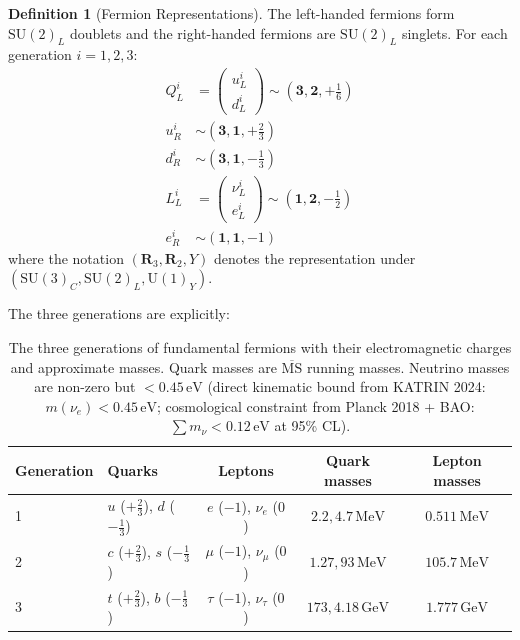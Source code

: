 \documentclass[12pt]{article}
\theoremstyle{definition}
\newtheorem{definition}[theorem]{Definition}
\theoremstyle{remark}
\newcommand{\GeV}{\,\mathrm{GeV}}
\newcommand{\MeV}{\,\mathrm{MeV}}
\begin{document}
\begin{definition}[Fermion Representations]
\label{def:fermionreps}
The left-handed fermions form $\mathrm{SU}(2)_L$ doublets and the right-handed fermions are $\mathrm{SU}(2)_L$ singlets. For each generation $i = 1, 2, 3$:
\begin{align}
Q_L^i &= \begin{pmatrix} u_L^i \\ d_L^i \end{pmatrix} \sim (\mathbf{3}, \mathbf{2}, +\tfrac{1}{6}) \\[4pt]
u_R^i &\sim (\mathbf{3}, \mathbf{1}, +\tfrac{2}{3}) \\[4pt]
d_R^i &\sim (\mathbf{3}, \mathbf{1}, -\tfrac{1}{3}) \\[4pt]
L_L^i &= \begin{pmatrix} \nu_L^i \\ e_L^i \end{pmatrix} \sim (\mathbf{1}, \mathbf{2}, -\tfrac{1}{2}) \\[4pt]
e_R^i &\sim (\mathbf{1}, \mathbf{1}, -1)
\end{align}
where the notation $(\mathbf{R}_3, \mathbf{R}_2, Y)$ denotes the representation under $(\mathrm{SU}(3)_C, \mathrm{SU}(2)_L, \mathrm{U}(1)_Y)$.
\end{definition}

The three generations are explicitly:

\begin{table}[h]
\centering
\begin{tabular}{llccc}
\toprule
Generation & Quarks & Leptons & Quark masses & Lepton masses \\
\midrule
1 & $u$ ($+\frac{2}{3}$), $d$ ($-\frac{1}{3}$) & $e$ ($-1$), $\nu_e$ ($0$) & $2.2, 4.7\MeV$ & $0.511\MeV$ \\
2 & $c$ ($+\frac{2}{3}$), $s$ ($-\frac{1}{3}$) & $\mu$ ($-1$), $\nu_\mu$ ($0$) & $1.27, 93\MeV$ & $105.7\MeV$ \\
3 & $t$ ($+\frac{2}{3}$), $b$ ($-\frac{1}{3}$) & $\tau$ ($-1$), $\nu_\tau$ ($0$) & $173, 4.18\GeV$ & $1.777\GeV$ \\
\bottomrule
\end{tabular}
\caption{The three generations of fundamental fermions with their electromagnetic charges and approximate masses. Quark masses are $\overline{\mathrm{MS}}$ running masses. Neutrino masses are non-zero but $< 0.45\,\mathrm{eV}$ (direct kinematic bound from KATRIN 2024: $m(\nu_e) < 0.45\,\mathrm{eV}$; cosmological constraint from Planck 2018 + BAO: $\sum m_\nu < 0.12\,\mathrm{eV}$ at 95\% CL).}
\label{tab:fermions}
\end{table}
\end{document}
